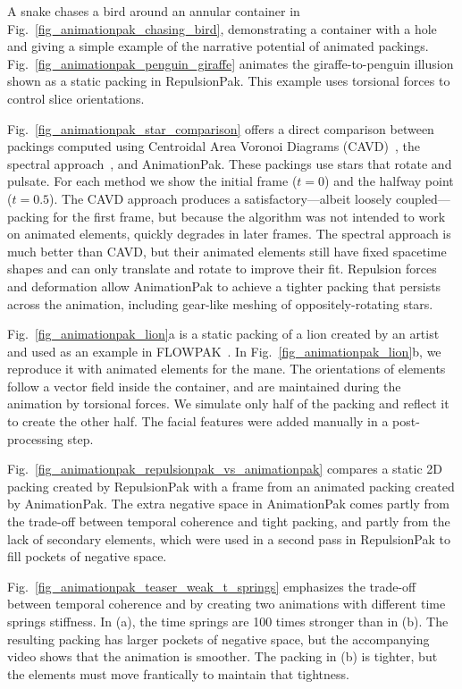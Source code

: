 A snake chases a bird around an annular container in 
Fig.~\ref{fig_animationpak_chasing_bird}, demonstrating a container with a hole
and giving a simple example of the narrative potential of animated
packings.  Fig.~\ref{fig_animationpak_penguin_giraffe} animates the giraffe-to-penguin
illusion shown as a static packing in RepulsionPak.  This example
uses torsional forces to control slice orientations.

Fig.~\ref{fig_animationpak_star_comparison} offers a direct comparison between
packings computed using Centroidal Area Voronoi Diagrams
(CAVD)~\cite{Smith2005}, the spectral approach~\cite{Dalal2006}, and
AnimationPak.
These packings use stars that rotate and pulsate.
For each method we show the initial frame ($t=0$) and the halfway point
($t=0.5$).  The CAVD approach produces a satisfactory---albeit
loosely coupled---packing for the first frame, but because the 
algorithm was not intended to work on animated elements, 
 quickly degrades in later frames.
The spectral approach is much better
than CAVD, but their animated elements still have fixed spacetime shapes
and can only translate and rotate to improve their fit. 
Repulsion
forces and deformation allow AnimationPak to achieve a tighter packing
that persists across the animation, including gear-like meshing of
oppositely-rotating stars.


Fig.~\ref{fig_animationpak_lion}a is a static packing of a lion created by an artist and
used as an example in FLOWPAK~\cite{Saputra2017}.  In Fig.~\ref{fig_animationpak_lion}b,
we reproduce it with animated elements for the mane.
The orientations of elements follow a vector field inside
the container, and are maintained during the animation by 
torsional forces.
We simulate only half of the packing and reflect it to create the other half.
The facial features were added manually in a post-processing step.

Fig.~\ref{fig_animationpak_repulsionpak_vs_animationpak} compares
a static 2D packing created by RepulsionPak with a frame
from an animated packing created by AnimationPak.
The extra negative space in AnimationPak comes partly from the trade-off
between temporal coherence and tight packing, and partly from the lack
of secondary elements, which were used in a second pass in RepulsionPak 
to fill pockets of negative space.

Fig.~\ref{fig_animationpak_teaser_weak_t_springs} emphasizes the trade-off between
temporal coherence and  by creating two animations
with different time springs stiffness.  In (a), the time springs
are 100 times stronger than in (b).  The resulting packing has larger
pockets of negative space, but the accompanying video shows that the
animation is smoother.  The packing in (b) is tighter, but the elements
must move frantically to maintain that tightness.


